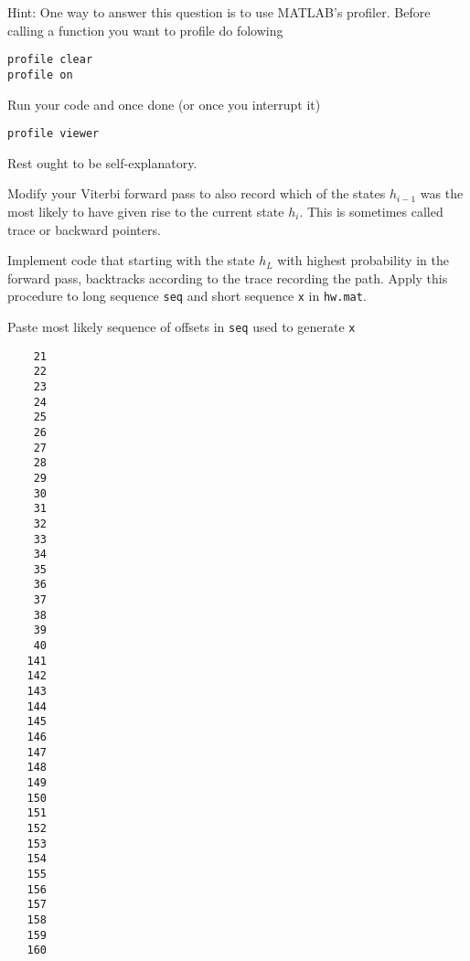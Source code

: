 \documentclass{article}
\begin{document}
Hint: One way to answer this question is to use MATLAB's profiler. Before calling a function you want to profile do folowing
\begin{verbatim}
profile clear
profile on
\end{verbatim}
Run your code and once done (or once you interrupt it)
\begin{verbatim}
profile viewer
\end{verbatim}
Rest ought to be self-explanatory.



\newproblem{3pt} Modify your Viterbi forward pass to also record which of the states  $h_{i-1}$ was the most likely to have given rise to the current state $h_{i}$. This is sometimes called trace or backward pointers.

Implement code that starting with the state $h_L$ with highest probability in the forward pass, backtracks according to the trace recording the path. Apply this procedure to long sequence {\tt seq} and short sequence {\tt x} in {\tt hw\theHW.mat}.

Paste most likely sequence of offsets in {\tt seq} used to generate {\tt x}
\begin{verbatim}
    21
    22
    23
    24
    25
    26
    27
    28
    29
    30
    31
    32
    33
    34
    35
    36
    37
    38
    39
    40
   141
   142
   143
   144
   145
   146
   147
   148
   149
   150
   151
   152
   153
   154
   155
   156
   157
   158
   159
   160
\end{verbatim}
\end{document}
